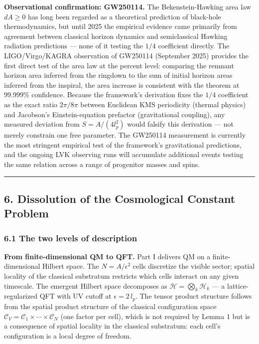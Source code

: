 \documentclass[
]{article}
\begin{document}
\textbf{Observational confirmation: GW250114.} The Bekenstein-Hawking
area law \(dA \geq 0\) has long been regarded as a theoretical
prediction of black-hole thermodynamics, but until 2025 the empirical
evidence came primarily from agreement between classical horizon
dynamics and semiclassical Hawking radiation predictions --- none of it
testing the \(1/4\) coefficient directly. The LIGO/Virgo/KAGRA
observation of GW250114 (September 2025) provides the first direct test
of the area law at the percent level: comparing the remnant horizon area
inferred from the ringdown to the sum of initial horizon areas inferred
from the inspiral, the area increase is consistent with the theorem at
\(99.999\%\) confidence. Because the framework's derivation fixes the
\(1/4\) coefficient as the exact ratio \(2\pi/8\pi\) between Euclidean
KMS periodicity (thermal physics) and Jacobson's Einstein-equation
prefactor (gravitational coupling), any measured deviation from
\(S = A/(4 l_p^2)\) would falsify this derivation --- not merely
constrain one free parameter. The GW250114 measurement is currently the
most stringent empirical test of the framework's gravitational
predictions, and the ongoing LVK observing runs will accumulate
additional events testing the same relation across a range of progenitor
masses and spins.

\begin{center}\rule{0.5\linewidth}{0.5pt}\end{center}

\hypertarget{dissolution-of-the-cosmological-constant-problem}{%
\subsection{6. Dissolution of the Cosmological Constant
Problem}\label{dissolution-of-the-cosmological-constant-problem}}

\hypertarget{the-two-levels-of-description}{%
\subsubsection{6.1 The two levels of
description}\label{the-two-levels-of-description}}

\textbf{From finite-dimensional QM to QFT.} Part I delivers QM on a
finite-dimensional Hilbert space. The \(N = A/\epsilon^2\) cells
discretize the visible sector; spatial locality of the classical
substratum restricts which cells interact on any given timescale. The
emergent Hilbert space decomposes as
\(\mathcal{H} = \bigotimes_k \mathcal{H}_k\) --- a lattice-regularized
QFT with UV cutoff at \(\epsilon = 2\,l_p\). The tensor product
structure follows from the spatial product structure of the classical
configuration space
\(\mathcal{C}_V = \mathcal{C}_1 \times \cdots \times \mathcal{C}_N\)
(one factor per cell), which is not required by Lemma 1 but is a
consequence of spatial locality in the classical substratum: each cell's
configuration is a local degree of freedom.
\end{document}
